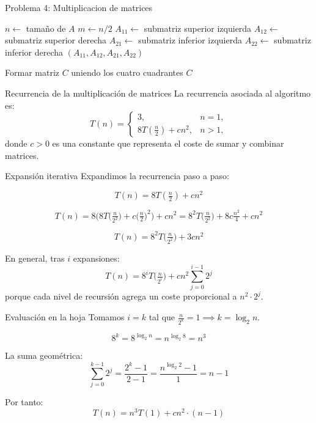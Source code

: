 \documentclass{beamer}
\begin{document}
\begin{frame}{Problema 4: Multiplicacion de matrices}
\begin{algorithm}[H]
\caption{Dividir y combinar matrices}
\begin{algorithmic}[1]
  \State $n \gets$ tamaño de $A$
  \State $m \gets n/2$
  \State $A_{11} \gets$ submatriz superior izquierda
  \State $A_{12} \gets$ submatriz superior derecha
  \State $A_{21} \gets$ submatriz inferior izquierda
  \State $A_{22} \gets$ submatriz inferior derecha
  \State \Return $(A_{11}, A_{12}, A_{21}, A_{22})$
\EndFunction

  \State Formar matriz $C$ uniendo los cuatro cuadrantes
  \State \Return $C$
\EndFunction
\end{algorithmic}
\end{algorithm}
\end{frame}



\begin{frame}{Recurrencia de la multiplicación de matrices}
La recurrencia asociada al algoritmo es:
\[
T(n) =
\begin{cases}
3, & n = 1, \\[6pt]
8T\!\left(\tfrac{n}{2}\right) + c n^2, & n > 1,
\end{cases}
\]
donde $c>0$ es una constante que representa el coste de sumar y combinar matrices.
\end{frame}

\begin{frame}{Expansión iterativa}
Expandimos la recurrencia paso a paso:

\[
T(n) = 8T\!\left(\tfrac{n}{2}\right) + c n^2
\]

\[
T(n) = 8\Big(8T\!\big(\tfrac{n}{2^2}\big) + c\big(\tfrac{n}{2}\big)^2\Big) + c n^2
= 8^2 T\!\big(\tfrac{n}{2^2}\big) + 8c \tfrac{n^2}{4} + c n^2
\]

\[
T(n) = 8^2 T\!\big(\tfrac{n}{2^2}\big) + 3c n^2
\]

En general, tras $i$ expansiones:
\[
T(n) = 8^i T\!\big(\tfrac{n}{2^i}\big) + c n^2 \sum_{j=0}^{i-1} 2^j
\]
porque cada nivel de recursión agrega un coste proporcional a $n^2 \cdot 2^j$.
\end{frame}

\begin{frame}{Evaluación en la hoja}
Tomamos $i=k$ tal que $\tfrac{n}{2^k}=1 \implies k=\log_2 n$.

\[
8^k = 8^{\log_2 n} = n^{\log_2 8} = n^3
\]

La suma geométrica:
\[
\sum_{j=0}^{k-1} 2^j = \frac{2^k - 1}{2 - 1} = \frac{n^{\log_2 2}-1}{1} = {n - 1}
\]

Por tanto:
\[
T(n) = n^3 T(1) + c n^2 \cdot {(n - 1)}
\]
\end{frame}
\end{document}
